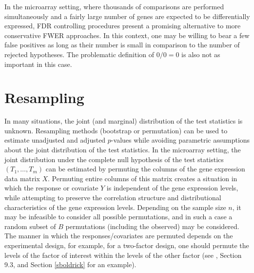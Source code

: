\documentclass[11pt]{article}
\begin{document}
In the microarray setting, where thousands of comparisons are performed simultaneously and a fairly large number of genes are expected to be differentially expressed, FDR controlling procedures present a promising alternative to more conservative FWER approaches. In this context, one may be willing to bear a few false positives as long as their number is small in comparison to the number of rejected hypotheses. The problematic definition of $0/0=0$ is also not as important in this case.


\section{Resampling}\label{sresamp}

In many situations, the joint (and marginal) distribution of the test
statistics is unknown. Resampling methods (bootstrap or permutation)
can be used to estimate unadjusted and adjusted $p$-values while
avoiding parametric assumptions about the joint distribution
of the test statistics. In the microarray setting, the joint
distribution under the complete null hypothesis of the test statistics
$(T_1,\ldots, T_m)$ can be estimated by permuting the columns of the
gene expression data matrix $X$. Permuting entire columns of this
matrix creates a situation in which the response or covariate $Y$ is
independent of the gene expression levels, while attempting to
preserve the correlation structure and distributional characteristics
of the gene expression levels. Depending on the sample size $n$, it may
be infeasible to consider all possible permutations, and in such a
case a random subset of $B$ permutations (including the observed) may be
considered. The manner in which the responses/covariates are permuted
depends on the experimental design, for example, for a two-factor
design, one should permute the levels of the factor of interest within
the levels of the other factor (see \cite{Scheffe}, Section 9.3, and Section \ref{sboldrick} for an example).



\begin{center}
\end{center}
\end{document}
